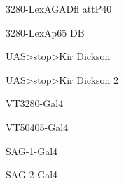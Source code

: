 \documentclass[17pt]{extarticle}
\begin{document}
\newpage{}
\vspace*{\fill}\begin{footnotesize}
3280-LexAGADfl attP40 \\[0.5em]
\end{footnotesize}
\footnotesize
\vspace*{\fill}
\newpage{}
\vspace*{\fill}\begin{normalsize}
3280-LexAp65 DB \\[0.5em]
\end{normalsize}
\footnotesize
\vspace*{\fill}
\newpage{}
\vspace*{\fill}\begin{small}
UAS>stop>Kir Dickson \\[0.5em]
\end{small}
\footnotesize
\vspace*{\fill}
\newpage{}
\vspace*{\fill}\begin{footnotesize}
UAS>stop>Kir Dickson 2 \\[0.5em]
\end{footnotesize}
\footnotesize
\vspace*{\fill}
\newpage{}
\vspace*{\fill}\begin{normalsize}
VT3280-Gal4 \\[0.5em]
\end{normalsize}
\footnotesize
\vspace*{\fill}
\newpage{}
\vspace*{\fill}\begin{normalsize}
VT50405-Gal4 \\[0.5em]
\end{normalsize}
\footnotesize
\vspace*{\fill}
\newpage{}
\vspace*{\fill}\begin{large}
SAG-1-Gal4 \\[0.5em]
\end{large}
\footnotesize
\vspace*{\fill}
\newpage{}
\vspace*{\fill}\begin{large}
SAG-2-Gal4 \\[0.5em]
\end{large}
\footnotesize
\vspace*{\fill}
\newpage{}
\end{document}
